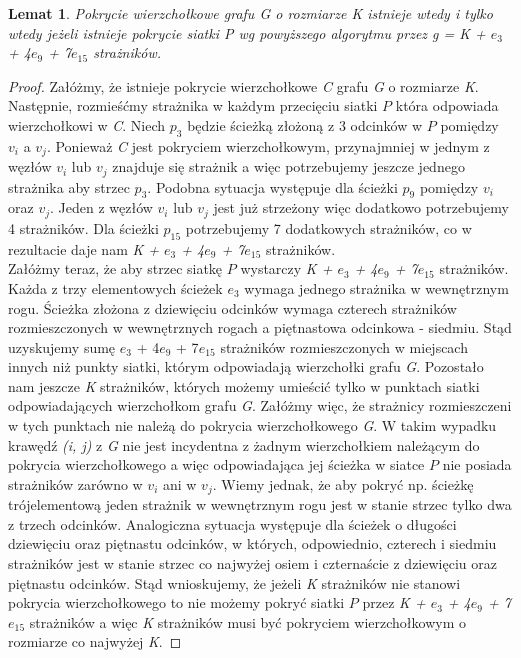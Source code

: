 \documentclass[brudnopis]{xmgr}
\newtheorem{Lemat}{Lemat} \theoremstyle{definition}
\begin{document}
\begin{Lemat}
	Pokrycie wierzchołkowe grafu \textnormal{G} o rozmiarze \textnormal{K} istnieje wtedy i tylko wtedy jeżeli istnieje pokrycie siatki \textnormal{P} wg powyższego algorytmu przez \textnormal{g = K + $e_3$ + 4$e_9$ + 7$e_{15}$} strażników.
\end{Lemat}
\begin{proof} 
	Załóżmy, że istnieje pokrycie wierzchołkowe \textit{C} grafu \textit{G} o rozmiarze \textit{K}. Następnie, rozmieśćmy strażnika w każdym przecięciu siatki $P$ która odpowiada wierzchołkowi w \textit{C}.
	Niech $p_3$ będzie ścieżką złożoną z 3 odcinków w $P$ pomiędzy $v_i$ a $v_j$. Ponieważ \textit{C} jest pokryciem wierzchołkowym, przynajmniej w jednym z węzłów $v_i$ lub $v_j$ znajduje się strażnik a więc potrzebujemy jeszcze jednego strażnika aby strzec $p_3$. Podobna sytuacja występuje dla ścieżki $p_9$ pomiędzy $v_i$ oraz $v_j$. Jeden z węzłów $v_i$ lub $v_j$ jest już strzeżony więc dodatkowo potrzebujemy 4 strażników. Dla ścieżki $p_{15}$ potrzebujemy 7 dodatkowych strażników, co w rezultacie daje nam \textit{K + $e_3$ + 4$e_9$ + 7$e_{15}$} strażników.
	\\\indent Załóżmy teraz, że aby strzec siatkę $P$ wystarczy \textit{K + $e_3$ + 4$e_9$ + 7$e_{15}$} strażników. Każda z trzy elementowych ścieżek $e_3$ wymaga jednego strażnika w wewnętrznym rogu. Ścieżka złożona z dziewięciu odcinków wymaga czterech strażników rozmieszczonych w wewnętrznych rogach a piętnastowa odcinkowa - siedmiu. Stąd uzyskujemy sumę $e_3$ + 4$e_9$ + 7$e_{15}$ strażników rozmieszczonych w miejscach innych niż punkty siatki, którym odpowiadają wierzchołki grafu \textit{G}. Pozostało nam jeszcze \textit{K} strażników, których możemy umieścić tylko w punktach siatki odpowiadających wierzchołkom grafu \textit{G}. Załóżmy więc, że strażnicy rozmieszczeni w tych punktach nie należą do pokrycia wierzchołkowego \textit{G}. W takim wypadku krawędź \textit{(i, j)} z \textit{G} nie jest incydentna z żadnym wierzchołkiem należącym do pokrycia wierzchołkowego a więc odpowiadająca jej ścieżka w siatce $P$ nie posiada strażników zarówno w $v_i$ ani w $v_j$. Wiemy jednak, że aby pokryć np. ścieżkę trójelementową jeden strażnik w wewnętrznym rogu jest w stanie strzec tylko dwa z trzech odcinków. Analogiczna sytuacja występuje dla ścieżek o długości dziewięciu oraz piętnastu odcinków, w których, odpowiednio, czterech i siedmiu strażników jest w stanie strzec co najwyżej osiem i czternaście z dziewięciu oraz piętnastu odcinków. Stąd wnioskujemy, że jeżeli \textit{K} strażników nie stanowi pokrycia wierzchołkowego to nie możemy pokryć siatki $P$ przez \textit{K + $e_3$ + 4$e_9$ + 7$e_{15}$} strażników a więc \textit{K} strażników musi być pokryciem wierzchołkowym o rozmiarze co najwyżej \textit{K}. 
\end{proof}
\end{document}
